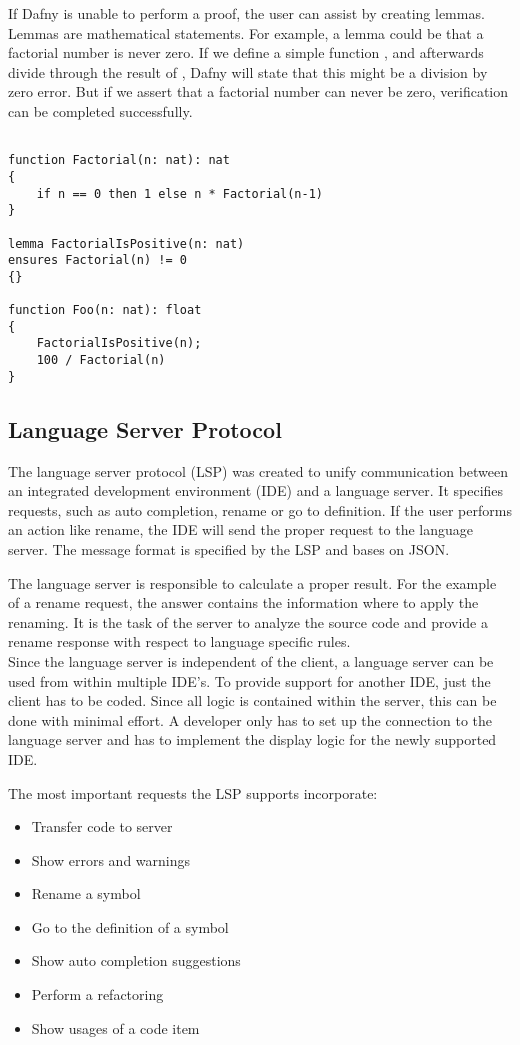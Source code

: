 If Dafny is unable to perform a proof, the user can assist by creating lemmas.
Lemmas are mathematical statements.
For example, a lemma could be that a factorial number is never zero.
If we define a simple function , and afterwards divide through the result of , Dafny will state that this might be a division by zero error.
But if we assert that a factorial number can never be zero, verification can be completed successfully.
\begin{lstlisting}[language=dafny, caption={Lemmas}, captionpos=b, label={lst:lemma}]

function Factorial(n: nat): nat
{
    if n == 0 then 1 else n * Factorial(n-1)
}

lemma FactorialIsPositive(n: nat)
ensures Factorial(n) != 0
{}

function Foo(n: nat): float
{
    FactorialIsPositive(n);
    100 / Factorial(n)
}
\end{lstlisting}


\subsection{Language Server Protocol}
The language server protocol (LSP) was created to unify communication between an integrated development environment (IDE) and a language server.
It specifies requests, such as auto completion, rename or go to definition.
If the user performs an action like rename, the IDE will send the proper request to the language server.
The message format is specified by the LSP and bases on JSON.

The language server is responsible to calculate a proper result.
For the example of a rename request, the answer contains the information where to apply the renaming.
It is the task of the server to analyze the source code and provide a rename response with respect to language specific rules.\\

Since the language server is independent of the client, a language server can be used from within multiple IDE's.
To provide support for another IDE, just the client has to be coded.
Since all logic is contained within the server, this can be done with minimal effort.
A developer only has to set up the connection to the language server and has to implement the display logic for the newly supported IDE.

The most important requests the LSP supports incorporate:
\begin{itemize}
    \item Transfer code to server
    \item Show errors and warnings
    \item Rename a symbol
    \item Go to the definition of a symbol
    \item Show auto completion suggestions
    \item Perform a refactoring
    \item Show usages of a code item
\end{itemize}

